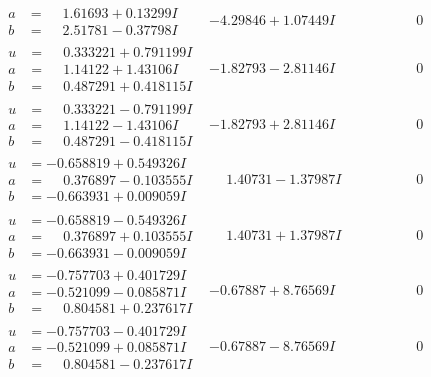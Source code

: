 \documentclass[1p]{elsarticle_modified}
\theoremstyle{definition}
\begin{document}
$$\begin{array}{c|c|c}
\begin{aligned}
a &= \phantom{-}1.61693 + 0.13299 I \\
b &= \phantom{-}2.51781 - 0.37798 I\end{aligned}
 & -4.29846 + 1.07449 I & \phantom{-0.000000 } 0 \\ \hline\begin{aligned}
u &= \phantom{-}0.333221 + 0.791199 I \\
a &= \phantom{-}1.14122 + 1.43106 I \\
b &= \phantom{-}0.487291 + 0.418115 I\end{aligned}
 & -1.82793 - 2.81146 I & \phantom{-0.000000 } 0 \\ \hline\begin{aligned}
u &= \phantom{-}0.333221 - 0.791199 I \\
a &= \phantom{-}1.14122 - 1.43106 I \\
b &= \phantom{-}0.487291 - 0.418115 I\end{aligned}
 & -1.82793 + 2.81146 I & \phantom{-0.000000 } 0 \\ \hline\begin{aligned}
u &= -0.658819 + 0.549326 I \\
a &= \phantom{-}0.376897 - 0.103555 I \\
b &= -0.663931 + 0.009059 I\end{aligned}
 & \phantom{-}1.40731 - 1.37987 I & \phantom{-0.000000 } 0 \\ \hline\begin{aligned}
u &= -0.658819 - 0.549326 I \\
a &= \phantom{-}0.376897 + 0.103555 I \\
b &= -0.663931 - 0.009059 I\end{aligned}
 & \phantom{-}1.40731 + 1.37987 I & \phantom{-0.000000 } 0 \\ \hline\begin{aligned}
u &= -0.757703 + 0.401729 I \\
a &= -0.521099 - 0.085871 I \\
b &= \phantom{-}0.804581 + 0.237617 I\end{aligned}
 & -0.67887 + 8.76569 I & \phantom{-0.000000 } 0 \\ \hline\begin{aligned}
u &= -0.757703 - 0.401729 I \\
a &= -0.521099 + 0.085871 I \\
b &= \phantom{-}0.804581 - 0.237617 I\end{aligned}
 & -0.67887 - 8.76569 I & \phantom{-0.000000 } 0\\

\end{array}$$
\end{document}
